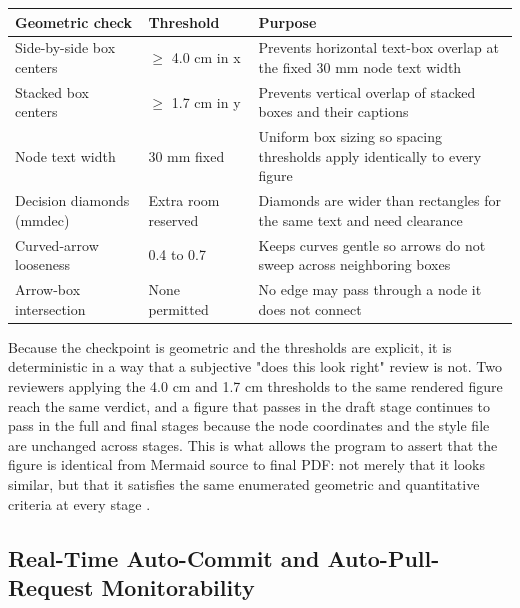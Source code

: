\noindent\begin{tabularx}{\textwidth}{L{4.6cm} L{3.2cm} Y}
\toprule
\textbf{Geometric check} & \textbf{Threshold} & \textbf{Purpose} \\
\midrule
Side-by-side box centers & $\geq$ 4.0 cm in x & Prevents horizontal text-box overlap at the fixed 30 mm node text width \\
Stacked box centers & $\geq$ 1.7 cm in y & Prevents vertical overlap of stacked boxes and their captions \\
Node text width & 30 mm fixed & Uniform box sizing so spacing thresholds apply identically to every figure \\
Decision diamonds (mmdec) & Extra room reserved & Diamonds are wider than rectangles for the same text and need clearance \\
Curved-arrow looseness & 0.4 to 0.7 & Keeps curves gentle so arrows do not sweep across neighboring boxes \\
Arrow-box intersection & None permitted & No edge may pass through a node it does not connect \\
\bottomrule
\end{tabularx}

Because the checkpoint is geometric and the thresholds are explicit, it is
deterministic in a way that a subjective "does this look right" review is not. Two
reviewers applying the 4.0 cm and 1.7 cm thresholds to the same rendered figure
reach the same verdict, and a figure that passes in the draft stage continues to
pass in the full and final stages because the node coordinates and the style file
are unchanged across stages. This is what allows the program to assert that the
figure is identical from Mermaid source to final PDF: not merely that it looks
similar, but that it satisfies the same enumerated geometric and quantitative
criteria at every stage \cite{fdadigtwinpc}.

\subsection{Real-Time Auto-Commit and Auto-Pull-Request Monitorability}

